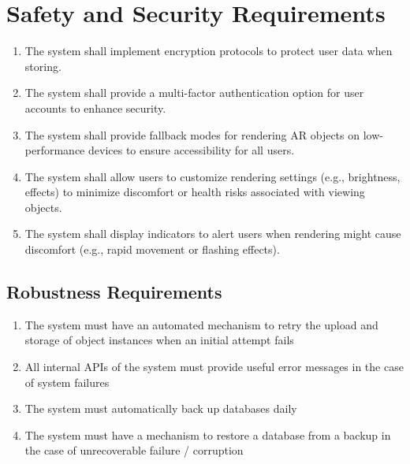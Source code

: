 \documentclass{article}
\begin{document}
\section{Safety and Security Requirements}


\begin{enumerate}[label=\textbf{SR-\arabic*},ref=SR-\arabic*]
    \item \label{SR-5} The system shall implement encryption protocols to protect user data when storing.
    \item \label{SR-6} The system shall provide a multi-factor authentication option for user accounts to enhance security.
    \item \label{SR-7} The system shall provide fallback modes for rendering AR objects on low-performance devices to ensure accessibility for all users.
    \item \label{SR-8} The system shall allow users to customize rendering settings (e.g., brightness, effects) to minimize discomfort or health risks associated with viewing objects.
    \item \label{SR-9} The system shall display indicators to alert users when rendering might cause discomfort (e.g., rapid movement or flashing effects).

\end{enumerate}

\subsection{Robustness Requirements}

\begin{enumerate}[label=\textbf{RR-\arabic*},ref=SR-\arabic*]
    \item \label{RR-1} The system must have an automated mechanism to retry the upload and storage of object instances when an initial attempt fails
    \item \label{RR-2} All internal APIs of the system must provide useful error messages in the case of system failures
    \item \label{RR-3} The system must automatically back up databases daily
    \item \label{RR-4} The system must have a mechanism to restore a database from a backup in the case of unrecoverable failure / corruption
\end{enumerate}
\end{document}
